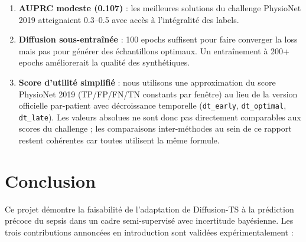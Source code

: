 \documentclass[11pt,a4paper]{article}
\begin{document}
\begin{enumerate}
    \item \textbf{AUPRC modeste (0.107)} : les meilleures solutions du challenge
    PhysioNet 2019 atteignaient 0.3--0.5 avec accès à l'intégralité des labels.
    \item \textbf{Diffusion sous-entraînée} : 100 epochs suffisent pour faire converger
    la loss mais pas pour générer des échantillons optimaux. Un entraînement à
    200+ epochs améliorerait la qualité des synthétiques.
    \item \textbf{Score d'utilité simplifié} : nous utilisons une approximation du score
    PhysioNet 2019 (TP/FP/FN/TN constants par fenêtre) au lieu de la version officielle
    par-patient avec décroissance temporelle (\texttt{dt\_early}, \texttt{dt\_optimal},
    \texttt{dt\_late}). Les valeurs absolues ne sont donc pas directement comparables
    aux scores du challenge ; les comparaisons inter-méthodes au sein de ce rapport
    restent cohérentes car toutes utilisent la même formule.
\end{enumerate}


\section{Conclusion}

Ce projet démontre la faisabilité de l'adaptation de Diffusion-TS à la prédiction
précoce du sepsis dans un cadre semi-supervisé avec incertitude bayésienne. Les
trois contributions annoncées en introduction sont validées expérimentalement :
\end{document}
